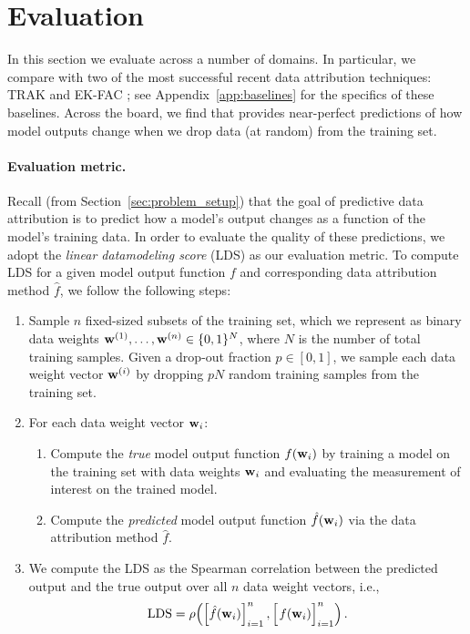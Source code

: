 \section{Evaluation}
\label{sec:results}
In this section we evaluate \method{} across a number of domains.
In particular, we compare \method{} with two of the most successful
recent data attribution techniques: TRAK \citep{park2023trak} and
EK-FAC \citep{grosse2023studying}; see Appendix~\ref{app:baselines} for the
specifics of these baselines.
Across the board, we find that \method{} provides near-perfect
predictions of how model outputs change when we drop data
(at random) from the training set.

\paragraph{Evaluation metric.}
Recall (from Section~\ref{sec:problem_setup}) that the goal of predictive
data attribution is to predict how a model's output changes as a function of
the model's training data. In order to evaluate the quality of these
predictions,
we adopt the {\em linear datamodeling score} (LDS)
\citep{ilyas2022datamodels,park2023trak}
as our evaluation metric. To compute LDS for a given model output function
$f$ and corresponding data attribution method $\hat{f}$, we follow
the following steps:
\begin{enumerate}
  \item Sample $n$ fixed-sized subsets of the training set,
    which we represent as binary data weights
    $\mathbf{w}^{(1)}, \ldots, \mathbf{w}^{(n)} \in \{0,1\}^N$,
    where $N$ is the number of total training samples.
    Given a drop-out fraction $p \in [0,1]$, we sample each data weight
    vector $\mathbf{w}^{(i)}$ by dropping $pN$ random training samples
    from the training set.

  \item For each data weight vector $\mathbf{w}_i$:
    \begin{enumerate}
      \item Compute the {\em true} model output function
        $f(\mathbf{w}_i)$ by training a model on the training set with
        data weights $\mathbf{w}_i$
        and evaluating the measurement of interest on the trained model.
      \item Compute the {\em predicted} model output function
        $\hat{f}(\mathbf{w}_i)$ via the data attribution method $\hat{f}$.
    \end{enumerate}

  \item We compute the LDS as the Spearman correlation between the predicted
    output and the true output over all $n$ data weight vectors, i.e.,
    \begin{align}
      \label{eq:lds}
      \text{LDS} =  \rho\!\left(\left[\hat{f}(\wvec_i)\right]_{i=1}^n,
      \left[\phantom{\hat{f}}\!\!\! f(\wvec_i)\right]_{i=1}^n\right).
    \end{align}
\end{enumerate}

